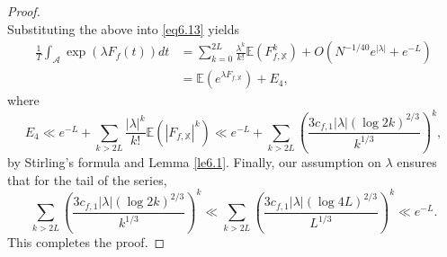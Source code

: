 \documentclass[10pt,leqno]{amsart}
\numberwithin{equation}{section}
\begin{document}
\begin{proof}
\[\]
Substituting the above into \eqref{eq6.13} yields
\[
\begin{aligned}
\frac{1}{T} \int_{\mathcal{A}} \exp (\lambda F_f(t)) d t & =\sum_{k=0}^{2 L} \frac{\lambda^k}{k!} \mathbb{E}\left(F_{f,\mathbb{X}}^k\right)+O\left(N^{-1 / 40} e^{|\lambda|}+e^{-L}\right) \\
& =\mathbb{E}\left(e^{\lambda F_{f,\mathbb{X}}}\right)+E_4,
\end{aligned}
\]
where
\[
E_4 \ll e^{-L}+\sum_{k>2 L} \frac{|\lambda|^k}{k!} \mathbb{E}\left(\left|F_{f,\mathbb{X}}\right|^k\right) \ll e^{-L}+\sum_{k>2 L}\left(\frac{3 c_{f,1}|\lambda|\left(\log 2k\right)^{2/3}}{k^{1 /3}}\right)^k,
\]
by Stirling's formula and Lemma \ref{le6.1}. Finally, our assumption on $\lambda$ ensures that for the tail of the series,
\[
\sum_{k > 2L} \left( \frac{3 c_{f,1} |\lambda|\left(\log 2k\right)^{2/3}}{k^{1 /3}} \right)^k
\ll \sum_{k > 2L} \left( \frac{3 c_{f,1} |\lambda|\left(\log 4L\right)^{2/3}}{L^{1 /3}} \right)^k
\ll e^{-L}.
\]
 This completes the proof.
\end{proof}
\end{document}
